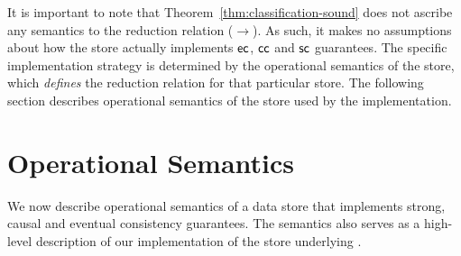 It is important to note that Theorem~\ref{thm:classification-sound} does not
ascribe any semantics to the reduction relation ($\xrightarrow{}$). As such, it
makes no assumptions about how the store actually implements ${\sf ec}$, ${\sf
cc}$ and ${\sf sc}$ guarantees. The specific implementation strategy is
determined by the operational semantics of the store, which \emph{defines} the
reduction relation for that particular store. The following section describes
operational semantics of the store used by the \quelea implementation.

\section{Operational Semantics}
\label{q_sec:meta-theory}

\renewcommand{\auxred}[4]{#1 \vdash #2 \;\xhookrightarrow{#3}\; #4 }

We now describe operational semantics of a data store that implements
strong, causal and eventual consistency guarantees. The semantics also
serves as a high-level description of our implementation of the store
underlying \quelea.

